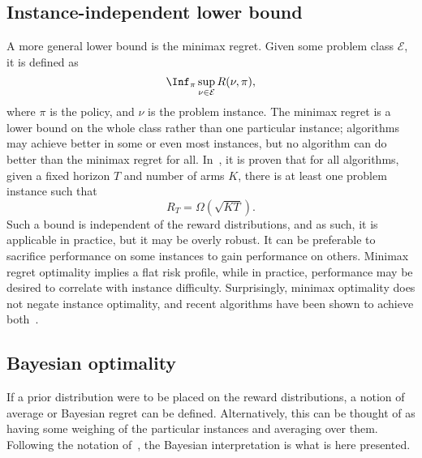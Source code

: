 \subsection{Instance-independent lower bound}
A more general lower bound is the minimax regret.
Given some problem class $\mathcal{E}$, it is defined as
\begin{equation}
    \Inf_{\pi} \sup_{\nu \in \mathcal{E}} R(\nu, \pi),
\end{equation}
where $\pi$ is the policy, and $\nu$ is the problem instance.
The minimax regret is a lower bound on the whole class rather than one particular instance; algorithms may achieve better in some or even most instances, but no algorithm can do better than the minimax regret for all.
In~\autocite{auer2002a}, it is proven that for all algorithms, given a fixed horizon $T$ and number of arms $K$, there is at least one problem instance such that\footnotemark
\begin{equation}
    R_T = \Omega(\sqrt{KT}).
\end{equation}
Such a bound is independent of the reward distributions, and as such, it is applicable in practice, but it may be overly robust.
It can be preferable to sacrifice performance on some instances to gain performance on others.
Minimax regret optimality implies a flat risk profile, while in practice, performance may be desired to correlate with instance difficulty.
Surprisingly, minimax optimality does not negate instance optimality, and recent algorithms have been shown to achieve both~\autocite{menard2017, jin2020}.


\subsection{Bayesian optimality}
\label{sec:bayesian-optimality}
If a prior distribution were to be placed on the reward distributions, a notion of average or Bayesian regret can be defined.
Alternatively, this can be thought of as having some weighing of the particular instances and averaging over them.
Following the notation of~\autocite{lattimore2020}, the Bayesian interpretation is what is here presented.

